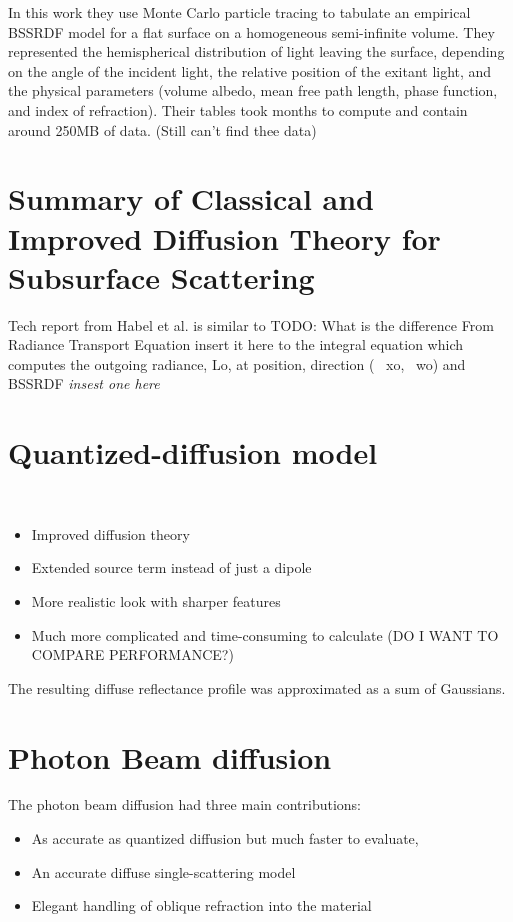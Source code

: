 In this work they use Monte Carlo particle tracing to tabulate an empirical
BSSRDF model for a flat surface on a homogeneous semi-infinite volume.
They represented the hemispherical distribution of light leaving the surface,
depending on the angle of the incident light, the relative position of the
exitant light, and the physical parameters (volume albedo, mean free path
length, phase function, and index of refraction). Their tables took months to
compute and contain around 250MB of data. (Still can't find thee data)

\section{Summary of \textbf{Classical and Improved Diffusion Theory for
Subsurface Scattering}}
Tech report from Habel et al. \cite{habel13cid} is similar to \cite{Habel:2013:PBD:2600890.2600896}
TODO: What is the difference
From Radiance Transport Equation {insert it here} to the integral equation which
computes the outgoing radiance, Lo, at position, direction (~ xo,~ wo) and
BSSRDF \textit{insest one here}


\section{Quantized-diffusion model}
\cite{D'Eon:2011:QMR:1964921.1964951}\\
\begin{itemize}
    \item Improved diffusion theory
    \item Extended source term instead of just a dipole
    \item More realistic look with sharper features
    \item Much more complicated and time-consuming to calculate (DO I WANT TO COMPARE PERFORMANCE?)
\end{itemize}
The resulting diffuse reflectance profile was approximated as a sum of Gaussians.

\section{Photon Beam diffusion}
The photon beam diffusion \cite{Habel:2013:PBD:2600890.2600896} had three main
contributions:
\begin{itemize}
    \item As accurate as quantized diffusion but much faster to evaluate,
    \item An accurate diffuse single-scattering model
    \item Elegant handling of oblique refraction into the material
\end{itemize}

